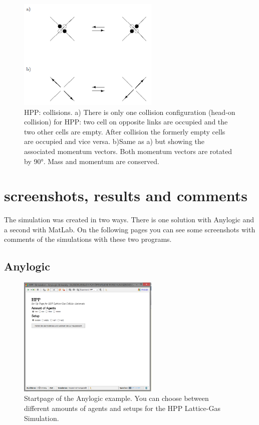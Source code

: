 \documentclass[paper=a4, fontsize=11pt]{scrartcl} %
\numberwithin{equation}{section} %
\numberwithin{figure}{section} %
\numberwithin{table}{section} %
\begin{document}
\begin{figure}[!htp]
	\centering
		\includegraphics[width=0.60\textwidth]{Screenshots/ImplementationRules-2.PNG}
	\caption[HPP collisions]{HPP: collisions. 
a) There is only one collision configuration (head-on collision) for HPP: two cell on opposite links are occupied and the two other cells are empty. After collision the formerly empty cells are occupied and vice versa. 
b)Same as a) but showing the associated momentum vectors. Both momentum vectors are rotated by 90°. Mass and momentum are conserved. \cite{LGCA} }
	\label{fig:collisions}
\end{figure}

\pagebreak
\section{screenshots, results and comments}
The simulation was created in two ways. There is one solution with Anylogic and a second with MatLab. On the following pages you can see some screenshots with comments of the simulations with these two programs.

\subsection{Anylogic}

\begin{figure}[!htp]
	\centering
		\includegraphics[width=0.60\textwidth]{Screenshots/Anylogic-Start.PNG}
	\caption[Anylogic Startpage]{Startpage of the Anylogic example. You can choose between different amounts of agents and setups for the HPP Lattice-Gas Simulation.}
	\label{fig:anylogic-start}
\end{figure}
\end{document}
